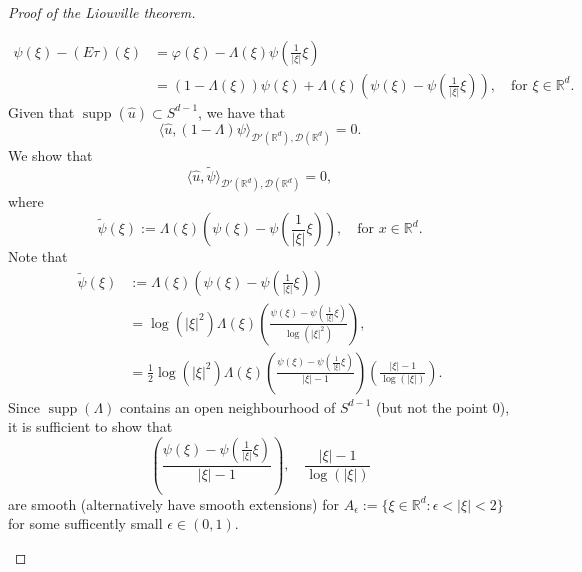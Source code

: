 \documentclass[11pt]{amsart}
\DeclareMathOperator{\supp}{supp}
\newcommand{\R}{\mathbb{R}}
\begin{document}
\begin{proof}[Proof of the Liouville theorem]
\begin{enumerate}
\begin{equation*}
\begin{split}
	\psi(\xi)-(E\tau)(\xi)&=\varphi(\xi)-\Lambda(\xi)\psi\left ( \frac{1}{|\xi|}\xi\right)\\
	&=(1-\Lambda(\xi))\psi(\xi)+\Lambda(\xi)\left (\psi(\xi)-\psi\left ( \frac{1}{|\xi|}\xi\right)\right ), \quad \text{for $\xi\in \R^d$}. 
\end{split}
\end{equation*} 
Given that $\supp(\hat{u})\subset S^{d-1}$, we have that 
\begin{equation*}
	\langle\hat{u},(1-\Lambda)\psi\rangle_{\mathcal{D}'(\R^d),\mathcal{D}(\R^d)}=0.
\end{equation*}
We show that 
\begin{equation*}
	\langle\hat{u},\tilde{\psi}\rangle_{\mathcal{D}'(\R^d),\mathcal{D}(\R^d)}=0,
\end{equation*}
where
\begin{equation*}
\tilde{\psi}(\xi):=\Lambda(\xi)\left (\psi(\xi)-\psi\left ( \frac{1}{|\xi|}\xi\right)\right ), \quad \text{for $x\in \R^d$}. 
\end{equation*}
Note that 
\begin{equation*}
\begin{split}
	\tilde{\psi}(\xi)&:=\Lambda(\xi)\left (\psi(\xi)-\psi\left ( \frac{1}{|\xi|}\xi\right)\right )\\
	&=\log(|\xi|^2)\Lambda(\xi)\left (\frac{\psi(\xi)-\psi\left ( \frac{1}{|\xi|}\xi\right)}{\log(|\xi|^2)}\right ),\\
	&=\frac{1}{2}\log(|\xi|^2)\Lambda(\xi)\left (\frac{\psi(\xi)-\psi\left ( \frac{1}{|\xi|}\xi\right)}{|\xi|-1}\right )\left (\frac{|\xi|-1}{\log(|\xi|)}\right ).
\end{split}
\end{equation*}
Since $\supp(\Lambda)$ contains an open neighbourhood of $S^{d-1}$ (but not the point $0$), it is sufficient to show that 
\begin{equation*}
	\left (\frac{\psi(\xi)-\psi\left ( \frac{1}{|\xi|}\xi\right)}{|\xi|-1}\right ), \quad \frac{|\xi|-1}{\log(|\xi|)}
\end{equation*}
are smooth (alternatively have smooth extensions) for $A_{\epsilon}:=\{\xi\in \R^d:\epsilon<|\xi|<2\}$ for some sufficently small $\epsilon\in (0,1)$. 


\end{enumerate}
\end{proof}
\end{document}
